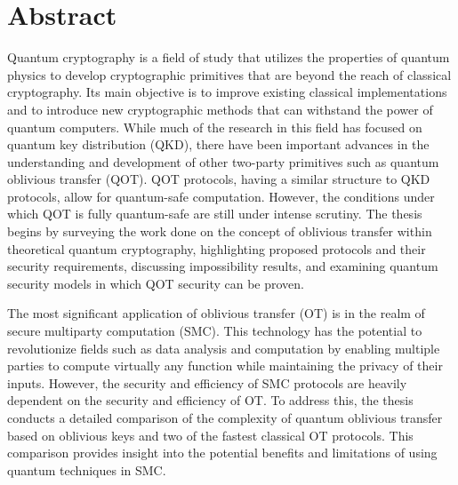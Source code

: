 
\chapter*{Abstract}

Quantum cryptography is a field of study that utilizes the properties of quantum physics to develop cryptographic primitives that are beyond the reach of classical cryptography. Its main objective is to improve existing classical implementations and to introduce new cryptographic methods that can withstand the power of quantum computers. While much of the research in this field has focused on quantum key distribution (QKD), there have been important advances in the understanding and development of other two-party primitives such as quantum oblivious transfer (QOT). QOT protocols, having a similar structure to QKD protocols, allow for quantum-safe computation. However, the conditions under which QOT is fully quantum-safe are still under intense scrutiny. The thesis begins by surveying the work done on the concept of oblivious transfer within theoretical quantum cryptography, highlighting proposed protocols and their security requirements, discussing impossibility results, and examining quantum security models in which QOT security can be proven.

The most significant application of oblivious transfer (OT) is in the realm of secure multiparty computation (SMC). This technology has the potential to revolutionize fields such as data analysis and computation by enabling multiple parties to compute virtually any function while maintaining the privacy of their inputs. However, the security and efficiency of SMC protocols are heavily dependent on the security and efficiency of OT. To address this, the thesis conducts a detailed comparison of the complexity of quantum oblivious transfer based on oblivious keys and two of the fastest classical OT protocols. This comparison provides insight into the potential benefits and limitations of using quantum techniques in SMC.

